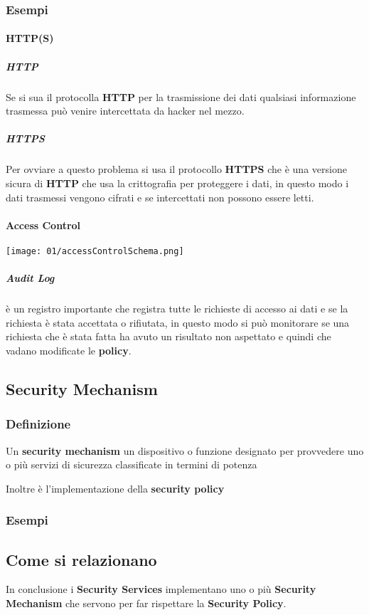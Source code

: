             \subsubsection{Esempi}
                \paragraph{HTTP(S)}
                    \subparagraph{HTTP} Se si sua il protocolla \textbf{HTTP} per la trasmissione dei dati qualsiasi informazione trasmessa può venire intercettata da hacker nel mezzo.
                    \subparagraph{HTTPS} Per ovviare a questo problema si usa il protocollo \textbf{HTTPS} che è una versione sicura di \textbf{HTTP} che usa la crittografia per proteggere i dati, in questo modo i dati trasmessi vengono cifrati e se intercettati non possono essere letti.
                \paragraph{Access Control}
                    \texttt{[image: 01/accessControlSchema.png]}
                    \subparagraph{Audit Log} è un registro importante che registra tutte le richieste di accesso ai dati e se la richiesta è stata accettata o rifiutata, in questo modo si può monitorare se una richiesta che è stata fatta ha avuto un risultato non aspettato e quindi che vadano modificate le \textbf{policy}.
    \subsection{Security Mechanism}
    \label{subsec:securityMechanism}
        \subsubsection{Definizione} Un \textbf{security mechanism} un dispositivo o funzione designato per provvedere uno o più servizi di sicurezza classificate in termini di potenza
            
            Inoltre è l'implementazione della \textbf{security policy}
        \subsubsection{Esempi}
    \subsection{Come si relazionano}
        In conclusione i \textbf{Security Services} implementano uno o più \textbf{Security Mechanism} che servono per far rispettare la \textbf{Security Policy}.
        
